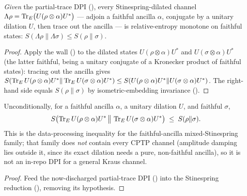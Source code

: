 \begin{theorem}\label{stinespring_relEntropy_monotone}
  \leanok
  \emph{Given} the partial-trace DPI (), every
  Stinespring-dilated channel \(\Lambda\rho = \operatorname{Tr}_E\bigl(U(\rho\otimes\alpha)U^{*}\bigr)\) ---
  adjoin a faithful ancilla \(\alpha\), conjugate by a unitary dilation \(U\), then trace out the
  ancilla --- is relative-entropy monotone on faithful states:
  \(S(\Lambda\rho\|\Lambda\sigma)\le S(\rho\|\sigma)\).
\end{theorem}
\begin{proof}\leanok
  Apply the wall () to the dilated states
  \(U(\rho\otimes\alpha)U^{*}\) and \(U(\sigma\otimes\alpha)U^{*}\) (the latter faithful, being a
  unitary conjugate of a Kronecker product of faithful states): tracing out the ancilla gives
  \(S(\operatorname{Tr}_E U(\rho\otimes\alpha)U^{*}\|\operatorname{Tr}_E U(\sigma\otimes\alpha)U^{*})\le
  S(U(\rho\otimes\alpha)U^{*}\|U(\sigma\otimes\alpha)U^{*})\). The right-hand side equals
  \(S(\rho\|\sigma)\) by isometric-embedding invariance ().
\end{proof}

\begin{theorem}\label{monotonicity_relEntropy_under_stinespring}
  \leanok
  Unconditionally, for a faithful ancilla \(\alpha\), a unitary dilation \(U\), and faithful
  \(\sigma\),
  \[
    S\bigl(\operatorname{Tr}_E U(\rho\otimes\alpha)U^{*}\,\big\|\,\operatorname{Tr}_E U(\sigma\otimes\alpha)U^{*}\bigr)
      \;\le\; S(\rho\|\sigma).
  \]
  This is the data-processing inequality for the faithful-ancilla mixed-Stinespring family; that
  family does \emph{not} contain every CPTP channel (amplitude damping lies outside it, since its
  exact dilation needs a pure, non-faithful ancilla), so it is not an in-repo DPI for a general
  Kraus channel.
\end{theorem}
\begin{proof}\leanok
  Feed the now-discharged partial-trace DPI () into the
  Stinespring reduction (), removing its hypothesis.
\end{proof}

